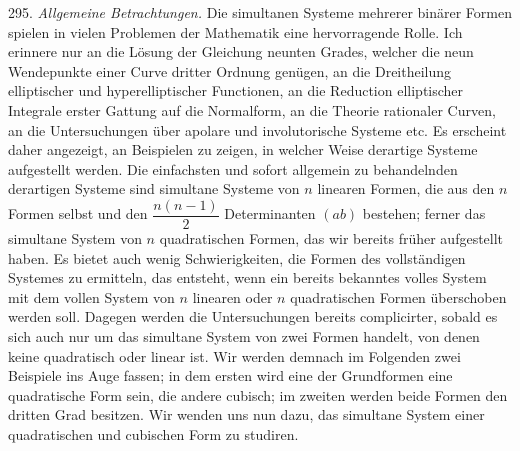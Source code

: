 295. \textit{Allgemeine Betrachtungen.} Die simultanen Systeme mehrerer binärer Formen spielen in vielen Problemen der Mathematik eine hervorragende Rolle. Ich erinnere nur an die Lösung der Gleichung neunten Grades, welcher die neun Wendepunkte einer Curve dritter Ordnung genügen, an die Dreitheilung elliptischer und hyperelliptischer Functionen, an die Reduction elliptischer Integrale erster Gattung auf die Normalform, an die Theorie rationaler Curven, an die Untersuchungen über apolare und involutorische Systeme etc. Es erscheint daher angezeigt, an Beispielen zu zeigen, in welcher Weise derartige Systeme aufgestellt werden. Die einfachsten und sofort allgemein zu behandelnden derartigen Systeme sind simultane Systeme von $n$ linearen Formen, die aus den $n$ Formen selbst und den $\dfrac{n(n-1)}{2}$ Determinanten $(ab)$ bestehen; ferner das simultane System von $n$ quadratischen Formen, das wir bereits früher aufgestellt haben. Es bietet auch wenig Schwierigkeiten, die Formen des vollständigen Systemes zu ermitteln, das entsteht, wenn ein bereits bekanntes volles System mit dem vollen System von $n$ linearen oder $n$ quadratischen Formen überschoben werden soll. Dagegen werden die Untersuchungen bereits complicirter, sobald es sich auch nur um das simultane System von zwei Formen handelt, von denen keine quadratisch oder linear ist. Wir werden demnach im Folgenden zwei Beispiele ins Auge fassen; in dem ersten wird eine der Grundformen eine quadratische Form sein, die andere cubisch; im zweiten werden beide Formen den dritten Grad besitzen. Wir wenden uns nun dazu, das simultane System einer quadratischen und cubischen Form zu studiren.


